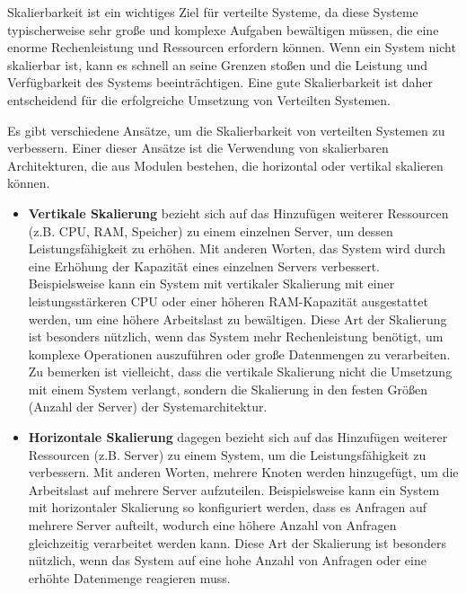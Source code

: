 Skalierbarkeit ist ein wichtiges Ziel für verteilte Systeme, da diese Systeme typischerweise sehr große und komplexe Aufgaben bewältigen müssen, die eine enorme Rechenleistung und Ressourcen erfordern können. Wenn ein System nicht skalierbar ist, kann es schnell an seine Grenzen stoßen und die Leistung und Verfügbarkeit des Systems beeinträchtigen. Eine gute Skalierbarkeit ist daher entscheidend für die erfolgreiche Umsetzung von Verteilten Systemen.

Es gibt verschiedene Ansätze, um die Skalierbarkeit von verteilten Systemen zu verbessern. Einer dieser Ansätze ist die Verwendung von skalierbaren Architekturen, die aus Modulen bestehen, die horizontal oder vertikal skalieren können. 

\begin{itemize}
\item \textbf{Vertikale Skalierung} bezieht sich auf das Hinzufügen weiterer Ressourcen (z.B. CPU, RAM, Speicher) zu einem einzelnen Server, um dessen Leistungsfähigkeit zu erhöhen. Mit anderen Worten, das System wird durch eine Erhöhung der Kapazität eines einzelnen Servers verbessert. Beispielsweise kann ein System mit vertikaler Skalierung mit einer leistungsstärkeren CPU oder einer höheren RAM-Kapazität ausgestattet werden, um eine höhere Arbeitslast zu bewältigen. Diese Art der Skalierung ist besonders nützlich, wenn das System mehr Rechenleistung benötigt, um komplexe Operationen auszuführen oder große Datenmengen zu verarbeiten. Zu bemerken ist vielleicht, dass die vertikale Skalierung nicht die Umsetzung mit einem System verlangt, sondern die Skalierung in den festen Größen (Anzahl der Server) der Systemarchitektur. 

\item \textbf{Horizontale Skalierung} dagegen bezieht sich auf das Hinzufügen weiterer Ressourcen (z.B. Server) zu einem System, um die Leistungsfähigkeit zu verbessern. Mit anderen Worten, mehrere Knoten werden hinzugefügt, um die Arbeitslast auf mehrere Server aufzuteilen. Beispielsweise kann ein System mit horizontaler Skalierung so konfiguriert werden, dass es Anfragen auf mehrere Server aufteilt, wodurch eine höhere Anzahl von Anfragen gleichzeitig verarbeitet werden kann. Diese Art der Skalierung ist besonders nützlich, wenn das System auf eine hohe Anzahl von Anfragen oder eine erhöhte Datenmenge reagieren muss.
\end{itemize}

